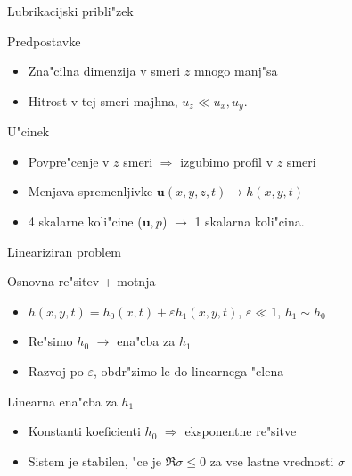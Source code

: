 \documentclass{beamer}
\renewcommand{\vec}{\mathbf}
\begin{document}
\begin{frame}{Lubrikacijski pribli"zek}
 \begin{block}{Predpostavke}
  \begin{itemize}
   \item Zna"cilna dimenzija v smeri $z$ mnogo manj"sa
   \item Hitrost v tej smeri majhna, $u_z \ll u_x, u_y$. 
  \end{itemize}
  \end{block}
  
  \begin{block}{U"cinek}
  \begin{itemize}
   \item Povpre"cenje v $z$ smeri $\Rightarrow$ izgubimo profil v $z$ smeri
   \item Menjava spremenljivke $\vec u(x,y,z,t) \to h(x,y,t)$
   \item 4 skalarne koli"cine ($\vec u, p$) $\to$ 1 skalarna koli"cina. 
   \end{itemize}
 \end{block}
\end{frame}

\begin{frame}{Lineariziran problem}
\begin{block}{Osnovna re"sitev + motnja}
\begin{itemize}
 \item $ h(x,y,t) = h_0(x,t) + \varepsilon h_1(x,y,t) $, \; $\varepsilon \ll 1$, \; $h_1 \sim h_0$
 \item Re"simo $h_0$ $\rightarrow$ ena"cba za $h_1$
 \item Razvoj po $\varepsilon$, obdr"zimo le do linearnega "clena
\end{itemize}
\end{block}

\begin{block}{Linearna ena"cba za $h_1$}
 \begin{itemize}
  \item Konstanti koeficienti $h_0$ $\Rightarrow$ eksponentne re"sitve
  \item Sistem je stabilen, "ce je $\Re \sigma \leq 0$ za vse lastne vrednosti $\sigma$
 \end{itemize}
\end{block}


\end{frame}
\end{document}
